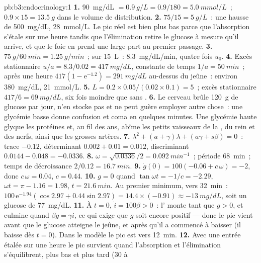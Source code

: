 \begin{solution}{pb:b3:endocrinology:1}
\textbf{1.} \qty{90}{mg/dL} $= \qty{0.9}{g/L} = 0.9/180 = \qty{5.0}{mmol/L}$~;
$0.9\times 15 = \qty{13.5}{g}$ dans le volume de distribution.
\textbf{2.} $75/15 = \qty{5}{g/L}$~: une hausse de \qty{500}{mg/dL},
\qty{28}{mmol/L}. Le pic réel est bien plus bas parce que l'absorption
s'étale sur une heure tandis que l'élimination retire le glucose à
mesure qu'il arrive, et que le foie en prend une large part au premier
passage.
\textbf{3.} $\qty{75}{g}/\qty{60}{min} = \qty{1.25}{g/min}$~; sur
\qty{15}{L}~: \qty{8.3}{mg/dL/min}, quatre fois $u_{0}$.
\textbf{4.} Excès stationnaire $u/a = 8.3/0.02 = \qty{417}{mg/dL}$,
constante de temps $1/a = \qty{50}{min}$~; après une heure $417(1 -
\mathrm{e}^{-1.2}) = \qty{291}{mg/dL}$ au-dessus du jeûne~: environ
\qty{380}{mg/dL}, \qty{21}{mmol/L}.
\textbf{5.} $L = 0.2\times 0.05/(0.02\times 0.1) = 5$~; excès stationnaire
$417/6 = \qty{69}{mg/dL}$, six fois moindre que sans .
\textbf{6.} Le cerveau brûle \qty{120}{g} de glucose par jour, n'en
stocke pas et ne peut guère employer autre chose~: une glycémie basse
donne confusion et coma en quelques minutes. Une glycémie haute glyque
les protéines et, au fil des ans, abîme les petits vaisseaux de la
, du rein et des nerfs, ainsi que les grosses artères.
\textbf{7.} $\lambda^{2} + (a + \gamma)\lambda + (a\gamma + s\beta) = 0$~:
trace $-0.12$, déterminant $0.002 + 0.01 = 0.012$, discriminant
$0.0144 - 0.048 = -0.0336$.
\textbf{8.} $\omega = \sqrt{0.0336}/2 = \qty{0.092}{min^{-1}}$~; période
\qty{68}{min}~; temps de décroissance $2/0.12 = \qty{16.7}{min}$.
\textbf{9.} $\dot g(0) = 100(-0.06 + c\,\omega) = -2$, donc $c\,\omega =
0.04$, $c = 0.44$.
\textbf{10.} $g = 0$ quand $\tan\omega t = -1/c = -2.29$, $\omega t =
\pi - 1.16 = 1.98$, $t = \qty{21.6}{min}$. Au premier minimum, vers
\qty{32}{min}~: $100\,\mathrm{e}^{-1.94}(\cos 2.97 + 0.44\sin 2.97) =
14.4\times(-0.91) \approx -\qty{13}{mg/dL}$, soit un glucose de \qty{77}{mg/dL}.
\textbf{11.} À $t = 0$, $\dot i = 100\beta > 0$~: l' monte tant
que $g > 0$, et culmine quand $\beta g = \gamma i$, ce qui exige que $g$
soit encore positif --- donc le pic vient avant que le glucose atteigne
le jeûne, et après qu'il a commencé à baisser (il baisse dès $t = 0$).
Dans le modèle le pic est vers \qty{12}{min}.
\textbf{12.} Avec une entrée étalée sur une heure le pic survient quand
l'absorption et l'élimination s'équilibrent, plus bas et plus tard (30 à

\end{solution}
